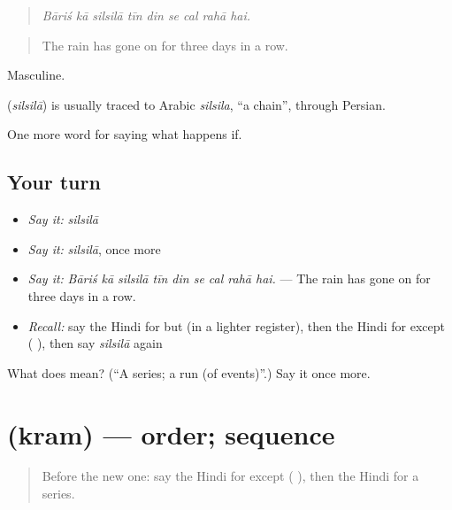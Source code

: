 \begin{quote}
\emph{Bāriś kā silsilā tīn din se cal rahā hai.}
\end{quote}

\begin{quote}
The rain has gone on for three days in a row.
\end{quote}

Masculine.

\begin{cousinweb}
\textbf{} (\emph{silsilā}) is usually traced to Arabic \emph{silsila}, \textquotedblleft{}a chain\textquotedblright{}, through Persian.
\end{cousinweb}

\begin{grammarlens}[title={What you've built}]
One more word for saying what happens if.
\end{grammarlens}

\subsection*{Your turn}
\begin{itemize}
\raggedright
  \item \emph{Say it:} \emph{silsilā}
  \item \emph{Say it:} \emph{silsilā}, once more
  \item \emph{Say it:} \emph{Bāriś kā silsilā tīn din se cal rahā hai.} — The rain has gone on for three days in a row.
  \item \emph{Recall:} say the Hindi for but (in a lighter register), then the Hindi for except ( ), then say \emph{silsilā} again
\end{itemize}

\begin{tcolorbox}[breakable,colback=teal!4,colframe=teal!35!black,title={Before you move on}]
What does  mean? (\textquotedblleft{}A series; a run (of events)\textquotedblright{}.) Say it once more.
\end{tcolorbox}
\section[\texorpdfstring{\hi{क्रम} (kram)}{क्रम (kram)}]{ (kram) — order; sequence}

\label{lesson:HI-C553-kram}



\begin{quote}
Before the new one: say the Hindi for except ( ), then the Hindi for a series.
\end{quote}


